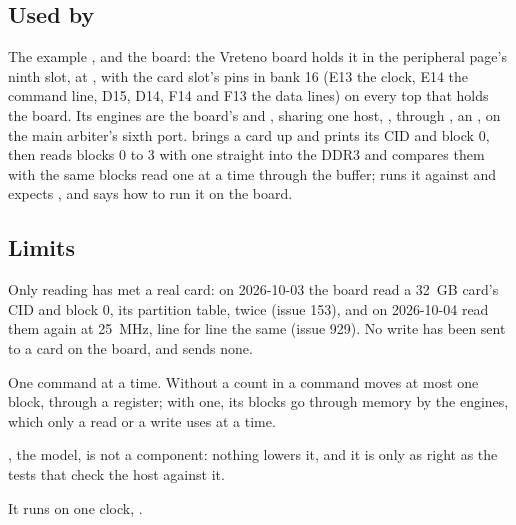 \subsection*{Used by}

The example , and the board: the Vreteno board holds it
in the peripheral page's ninth slot, at , with the card
slot's pins in bank 16 (E13 the clock, E14 the command line, D15,
D14, F14 and F13 the data lines) on every top that holds the board.
Its engines are the board's  and , sharing
one host, , through , an
, on the main arbiter's sixth port.
 brings a card up and prints its CID
and block 0, then reads blocks 0 to 3 with one  straight
into the DDR3 and compares them with the same blocks read one at a time
through the buffer;  runs it against
 and expects , and
 says how to run it on the board.

\subsection*{Limits}

Only reading has met a real card: on 2026-10-03 the board read a
32~GB card's CID and block 0, its partition table, twice (issue 153),
and on 2026-10-04 read them again at 25~MHz, line for line the same
(issue 929).
No write has been sent to a card on the board, and 
sends none.

One command at a time. Without a count in  a command
moves at most one block, through a register; with one, its blocks go
through memory by the engines, which only a read or a write uses at a
time.

, the model, is not a component: nothing lowers it, and
it is only as right as the tests that check the host against it.

It runs on one clock, .
